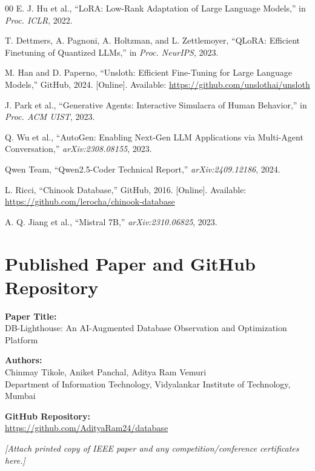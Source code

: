 \documentclass[12pt,a4paper]{report}
\begin{document}
\begin{thebibliography}{00}
E. J. Hu et al., ``LoRA: Low-Rank Adaptation of Large Language Models,'' in \textit{Proc. ICLR}, 2022.

T. Dettmers, A. Pagnoni, A. Holtzman, and L. Zettlemoyer, ``QLoRA: Efficient Finetuning of Quantized LLMs,'' in \textit{Proc. NeurIPS}, 2023.

M. Han and D. Paperno, ``Unsloth: Efficient Fine-Tuning for Large Language Models,'' GitHub, 2024. [Online]. Available: \url{https://github.com/unslothai/unsloth}

J. Park et al., ``Generative Agents: Interactive Simulacra of Human Behavior,'' in \textit{Proc. ACM UIST}, 2023.

Q. Wu et al., ``AutoGen: Enabling Next-Gen LLM Applications via Multi-Agent Conversation,'' \textit{arXiv:2308.08155}, 2023.

Qwen Team, ``Qwen2.5-Coder Technical Report,'' \textit{arXiv:2409.12186}, 2024.

L. Ricci, ``Chinook Database,'' GitHub, 2016. [Online]. Available: \url{https://github.com/lerocha/chinook-database}

A. Q. Jiang et al., ``Mistral 7B,'' \textit{arXiv:2310.06825}, 2023.

\end{thebibliography}

\appendix
\chapter{Published Paper and GitHub Repository}

\noindent\fontsize{10}{13}\selectfont

\textbf{Paper Title:}\\
DB-Lighthouse: An AI-Augmented Database Observation and Optimization Platform

\vspace{0.4cm}

\textbf{Authors:}\\
Chinmay Tikole, Aniket Panchal, Aditya Ram Vemuri\\
Department of Information Technology, Vidyalankar Institute of Technology, Mumbai

\vspace{0.4cm}

\textbf{GitHub Repository:}\\
\url{https://github.com/AdityaRam24/database}

\vspace{0.8cm}

\textit{[Attach printed copy of IEEE paper and any competition/conference certificates here.]}
\end{document}
